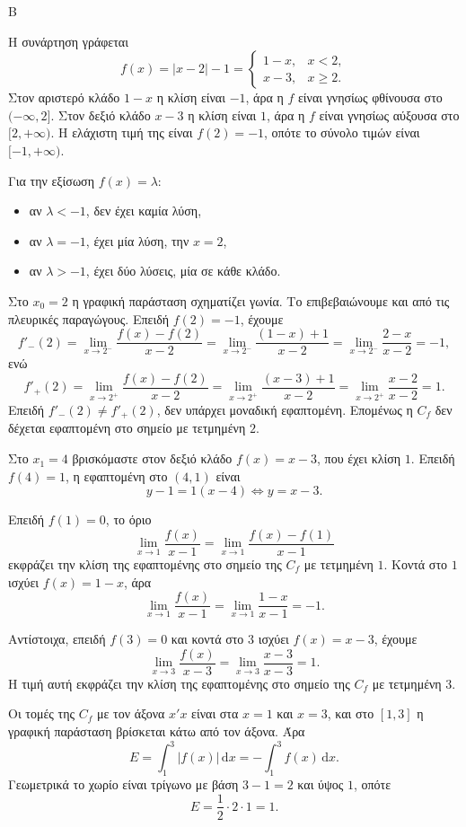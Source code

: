 \begin{thema}{Β}
\begin{erwthma}
\item Η συνάρτηση γράφεται
\[
f(x)=|x-2|-1=
\begin{cases}
1-x, & x<2,\\
x-3, & x\geq 2.
\end{cases}
\]
Στον αριστερό κλάδο $1-x$ η κλίση είναι $-1$, άρα η $f$ είναι γνησίως φθίνουσα στο $(-\infty,2]$. Στον δεξιό κλάδο $x-3$ η κλίση είναι $1$, άρα η $f$ είναι γνησίως αύξουσα στο $[2,+\infty)$. Η ελάχιστη τιμή της είναι $f(2)=-1$, οπότε το σύνολο τιμών είναι $[-1,+\infty)$.

Για την εξίσωση $f(x)=\lambda$:
\begin{itemize}
\item αν $\lambda<-1$, δεν έχει καμία λύση,
\item αν $\lambda=-1$, έχει μία λύση, την $x=2$,
\item αν $\lambda>-1$, έχει δύο λύσεις, μία σε κάθε κλάδο.
\end{itemize}

\item Στο $x_0=2$ η γραφική παράσταση σχηματίζει γωνία. Το επιβεβαιώνουμε και από τις πλευρικές παραγώγους. Επειδή $f(2)=-1$, έχουμε
\[
f'_-(2)=\lim_{x\to2^-}\frac{f(x)-f(2)}{x-2}
=\lim_{x\to2^-}\frac{(1-x)+1}{x-2}
=\lim_{x\to2^-}\frac{2-x}{x-2}
=-1,
\]
ενώ
\[
f'_+(2)=\lim_{x\to2^+}\frac{f(x)-f(2)}{x-2}
=\lim_{x\to2^+}\frac{(x-3)+1}{x-2}
=\lim_{x\to2^+}\frac{x-2}{x-2}
=1.
\]
Επειδή $f'_-(2)\ne f'_+(2)$, δεν υπάρχει μοναδική εφαπτομένη. Επομένως η $C_f$ δεν δέχεται εφαπτομένη στο σημείο με τετμημένη $2$.

Στο $x_1=4$ βρισκόμαστε στον δεξιό κλάδο $f(x)=x-3$, που έχει κλίση $1$. Επειδή $f(4)=1$, η εφαπτομένη στο $(4,1)$ είναι
\[
y-1=1(x-4)\Leftrightarrow y=x-3.
\]

\item Επειδή $f(1)=0$, το όριο
\[
\lim_{x\to1}\frac{f(x)}{x-1}
=\lim_{x\to1}\frac{f(x)-f(1)}{x-1}
\]
εκφράζει την κλίση της εφαπτομένης στο σημείο της $C_f$ με τετμημένη $1$. Κοντά στο $1$ ισχύει $f(x)=1-x$, άρα
\[
\lim_{x\to1}\frac{f(x)}{x-1}
=\lim_{x\to1}\frac{1-x}{x-1}=-1.
\]

Αντίστοιχα, επειδή $f(3)=0$ και κοντά στο $3$ ισχύει $f(x)=x-3$, έχουμε
\[
\lim_{x\to3}\frac{f(x)}{x-3}
=\lim_{x\to3}\frac{x-3}{x-3}=1.
\]
Η τιμή αυτή εκφράζει την κλίση της εφαπτομένης στο σημείο της $C_f$ με τετμημένη $3$.

\item Οι τομές της $C_f$ με τον άξονα $x'x$ είναι στα $x=1$ και $x=3$, και στο $[1,3]$ η γραφική παράσταση βρίσκεται κάτω από τον άξονα. Άρα
\[
E=\int_1^3 |f(x)|\,\mathrm{d}x=-\int_1^3 f(x)\,\mathrm{d}x.
\]
Γεωμετρικά το χωρίο είναι τρίγωνο με βάση $3-1=2$ και ύψος $1$, οπότε
\[
E=\frac12\cdot2\cdot1=1.
\]
\end{erwthma}
\end{thema}


